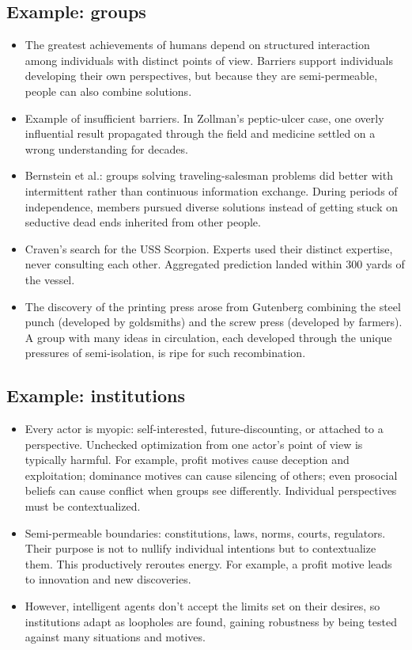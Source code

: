 \documentclass[11pt]{article}
\begin{document}
\subsection*{Example: groups}

\begin{itemize}
  \item The greatest achievements of humans depend on structured interaction among individuals with distinct points of view. Barriers support individuals developing their own perspectives, but because they are semi-permeable, people can also combine solutions.
  \item Example of insufficient barriers. In Zollman's peptic-ulcer case, one overly influential result propagated through the field and medicine settled on a wrong understanding for decades.
  \item Bernstein et al.: groups solving traveling-salesman problems did better with intermittent rather than continuous information exchange. During periods of independence, members pursued diverse solutions instead of getting stuck on seductive dead ends inherited from other people.
  \item Craven's search for the USS Scorpion. Experts used their distinct expertise, never consulting each other. Aggregated prediction landed within 300 yards of the vessel.
  \item The discovery of the printing press arose from Gutenberg combining the steel punch (developed by goldsmiths) and the screw press (developed by farmers). A group with many ideas in circulation, each developed through the unique pressures of semi-isolation, is ripe for such recombination.
\end{itemize}


\subsection*{Example: institutions}

\begin{itemize}
  \item Every actor is myopic: self-interested, future-discounting, or attached to a perspective. Unchecked optimization from one actor's point of view is typically harmful. For example, profit motives cause deception and exploitation; dominance motives can cause silencing of others; even prosocial beliefs can cause conflict when groups see differently. Individual perspectives must be contextualized.
  \item Semi-permeable boundaries: constitutions, laws, norms, courts, regulators. Their purpose is not to nullify individual intentions but to contextualize them. This productively reroutes energy. For example, a profit motive leads to innovation and new discoveries.
  \item However, intelligent agents don't accept the limits set on their desires, so institutions adapt as loopholes are found, gaining robustness by being tested against many situations and motives. 
\end{itemize}
\end{document}
